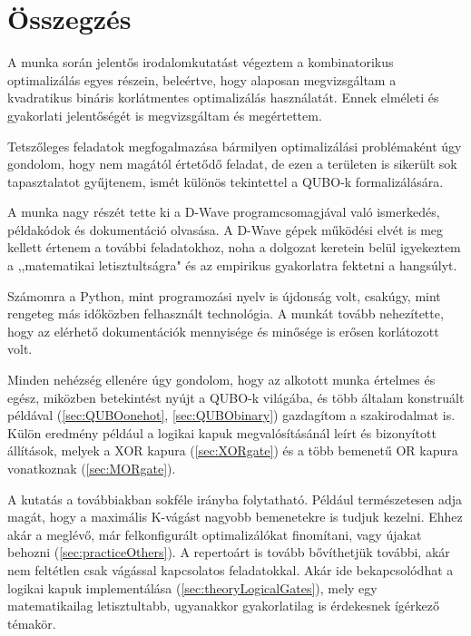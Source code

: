 
\chapter{Összegzés}

A munka során jelentős irodalomkutatást végeztem a kombinatorikus optimalizálás egyes részein, beleértve, hogy alaposan megvizsgáltam a kvadratikus bináris korlátmentes optimalizálás használatát. Ennek elméleti és gyakorlati jelentőségét is megvizsgáltam és megértettem.

Tetszőleges feladatok megfogalmazása bármilyen optimalizálási problémaként úgy gondolom, hogy nem magától értetődő feladat, de ezen a területen is sikerült sok tapasztalatot gyűjtenem, ismét különös tekintettel a QUBO-k formalizálására.

A munka nagy részét tette ki a D-Wave programcsomagjával való ismerkedés, példakódok és dokumentáció olvasása. A D-Wave gépek működési elvét is meg kellett értenem a további feladatokhoz, noha a dolgozat keretein belül igyekeztem a ,,matematikai letisztultságra" és az empirikus gyakorlatra fektetni a hangsúlyt.

Számomra a Python, mint programozási nyelv is újdonság volt, csakúgy, mint rengeteg más időközben felhasznált technológia. A munkát tovább nehezítette, hogy az elérhető dokumentációk mennyisége és minősége is erősen korlátozott volt.

Minden nehézség ellenére úgy gondolom, hogy az alkotott munka értelmes és egész, miközben betekintést nyújt a QUBO-k világába, és több általam konstruált példával (\ref{sec:QUBOonehot}, \ref{sec:QUBObinary}) gazdagítom a szakirodalmat is. Külön eredmény például a logikai kapuk megvalósításánál leírt és bizonyított állítások, melyek a XOR kapura (\ref{sec:XORgate}) és a több bemenetű OR kapura vonatkoznak (\ref{sec:MORgate}).

A kutatás a továbbiakban sokféle irányba folytatható. Például természetesen adja magát, hogy a maximális K-vágást nagyobb bemenetekre is tudjuk kezelni. Ehhez akár a meglévő, már felkonfigurált optimalizálókat finomítani, vagy újakat behozni (\ref{sec:practiceOthers}). A repertoárt is tovább bővíthetjük további, akár nem feltétlen csak vágással kapcsolatos feladatokkal. Akár ide bekapcsolódhat a logikai kapuk implementálása (\ref{sec:theoryLogicalGates}), mely egy matematikailag letisztultabb, ugyanakkor gyakorlatilag is érdekesnek ígérkező témakör.

